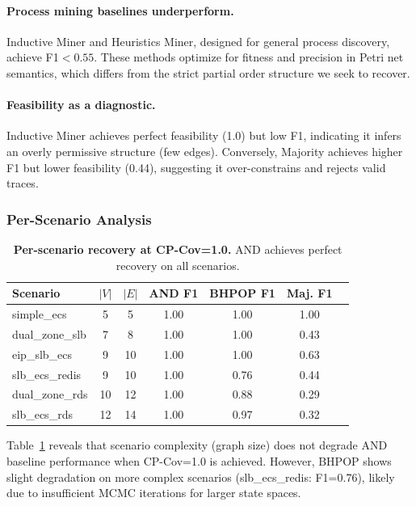 \paragraph{Process mining baselines underperform.} Inductive Miner and Heuristics Miner, designed for general process discovery, achieve F1$<0.55$. These methods optimize for fitness and precision in Petri net semantics, which differs from the strict partial order structure we seek to recover.

\paragraph{Feasibility as a diagnostic.} Inductive Miner achieves perfect feasibility (1.0) but low F1, indicating it infers an overly permissive structure (few edges). Conversely, Majority achieves higher F1 but lower feasibility (0.44), suggesting it over-constrains and rejects valid traces.

\subsubsection{Per-Scenario Analysis}
\label{sec:per_scenario}

\begin{table}[t]
\centering
\caption{\textbf{Per-scenario recovery at CP-Cov=1.0.} AND achieves perfect recovery on all scenarios.}
\label{tab:per_scenario}
\small
\setlength{\tabcolsep}{3pt}
\begin{tabular}{lcccccc}
\toprule
\textbf{Scenario} & \textbf{$|V|$} & \textbf{$|E|$} & \textbf{AND F1} & \textbf{BHPOP F1} & \textbf{Maj. F1} \\
\midrule
simple\_ecs & 5 & 5 & 1.00 & 1.00 & 1.00 \\
dual\_zone\_slb & 7 & 8 & 1.00 & 1.00 & 0.43 \\
eip\_slb\_ecs & 9 & 10 & 1.00 & 1.00 & 0.63 \\
slb\_ecs\_redis & 9 & 10 & 1.00 & 0.76 & 0.44 \\
dual\_zone\_rds & 10 & 12 & 1.00 & 0.88 & 0.29 \\
slb\_ecs\_rds & 12 & 14 & 1.00 & 0.97 & 0.32 \\
\bottomrule
\end{tabular}
\end{table}

Table~\ref{tab:per_scenario} reveals that scenario complexity (graph size) does not degrade AND baseline performance when CP-Cov=1.0 is achieved. However, BHPOP shows slight degradation on more complex scenarios (slb\_ecs\_redis: F1=0.76), likely due to insufficient MCMC iterations for larger state spaces.

